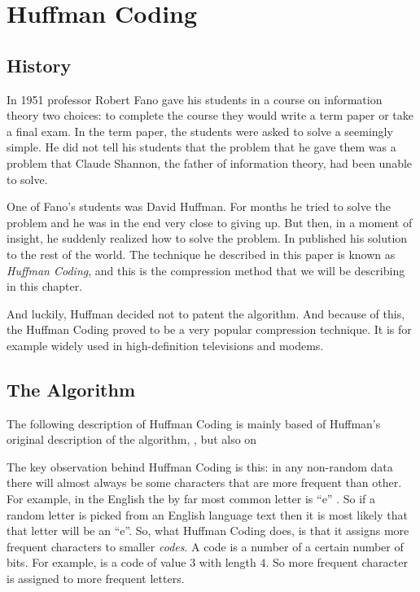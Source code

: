\begin{comment}
  
\end{comment}

\chapter{Huffman Coding}
\label{cha:crc}

\section{History}

In 1951 professor Robert Fano gave his students in a course on
information theory two choices: to complete the course they would
write a term paper or take a final exam. In the term paper, the
students were asked to solve a seemingly simple. He did not tell his
students that the problem that he gave them was a problem that Claude
Shannon, the father of information theory, had been unable to
solve\cite{stix91:_profil}.

One of Fano's students was David Huffman. For months he tried to solve
the problem and he was in the end very close to giving up. But then,
in a moment of insight, he suddenly realized how to solve the
problem. In \cite{huf52} published his solution to the rest of the
world. The technique he described in this paper is known as
\textit{Huffman Coding}, and this is the compression method that we
will be describing in this chapter.

And luckily, Huffman decided not to patent the algorithm. And because
of this, the Huffman Coding proved to be a very popular compression
technique. It is for example widely used in high-definition televisions
and modems.

\section{The Algorithm}

The following description of Huffman Coding is mainly based of
Huffman's original description of the algorithm, \cite{huf52}, but
also on \cite{Salomon:2004:DCC,mark1996data_compression_book} 

The key observation behind Huffman Coding is this: in any non-random
data there will almost always be some characters that are more
frequent than other. For example, in the English the by far most
common letter is ``e'' \cite{lewand2000cryptological}. So if a random
letter is picked from an English language text then it is most likely
that that letter will be an ``e''. So, what Huffman Coding does, is
that it assigns more frequent characters to smaller \textit{codes}. A
code is a number of a certain number of bits. For example, 
is a code of value $3$ with length $4$. So more frequent character is
assigned to more frequent letters.

